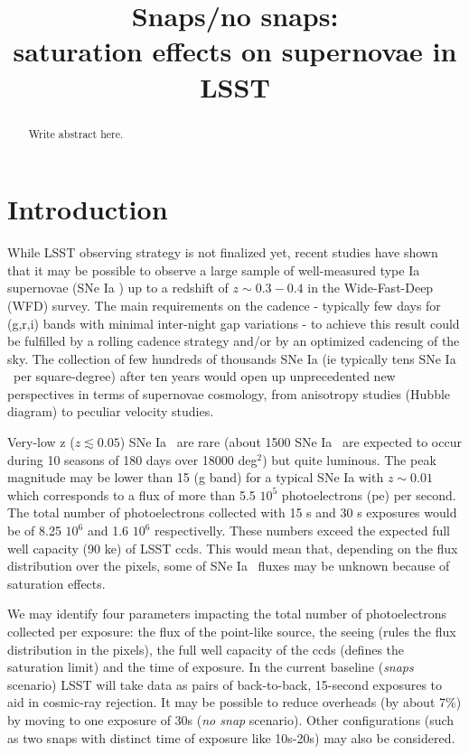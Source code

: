 \documentclass[\docopts]{\docclass}
\newcommand{\sne}{{SNe Ia }}
\newcommand{\pe}{{pe}}
\newcommand{\degsq}{deg$^2$}
\begin{document}
\title{Snaps/no snaps: \\ saturation effects on supernovae in LSST}

\maketitlepre

\begin{abstract}

  Write abstract here.

\end{abstract}

\dockeys{}

\maketitlepost


\section{Introduction}
\label{sec:intro}
While LSST observing strategy is not finalized yet, recent studies \cite{2018arXiv181200515L} have shown that it may be possible to observe a large sample of well-measured type Ia supernovae (\sne) up to a redshift of $z\sim 0.3-0.4$ in the Wide-Fast-Deep (WFD) survey. The main requirements on the cadence - typically few days for (g,r,i) bands with minimal inter-night gap variations - to achieve this result could be fulfilled by a rolling cadence strategy and/or by an optimized cadencing of the sky. The collection of few hundreds of thousands \sne (ie typically tens \sne~per square-degree) after ten years would open up unprecedented new perspectives in terms of supernovae cosmology, from anisotropy studies (Hubble diagram) to peculiar velocity studies.\par
Very-low z ($z \lesssim 0.05$) \sne~are rare (about 1500 \sne~are expected to occur during 10 seasons of 180 days over 18000 \degsq) but quite luminous. The peak magnitude may be lower than 15 (g band) for a typical \sne with $z\sim 0.01$ which corresponds to a flux of more than 5.5 $10^5$ photoelectrons (\pe) per second. The total number of photoelectrons collected with 15 s and 30 s exposures would be of 8.25 $ 10^{6}$ and 1.6 $ 10^{6}$ respectivelly.  These numbers exceed the expected full well capacity (90 ke) of LSST ccds. This would mean that, depending on the flux distribution over the pixels, some of \sne~fluxes may be unknown because of saturation effects. \par
We may identify four parameters impacting the total number of photoelectrons collected per exposure: the flux of the point-like source, the seeing (rules the flux distribution in the pixels), the full well capacity of the ccds (defines the saturation limit) and the time of exposure. In the current baseline ({\it snaps} scenario) LSST will take data as pairs of back-to-back, 15-second exposures to aid in cosmic-ray rejection. It may be possible to reduce overheads (by about 7\%) by moving to one exposure of 30s ({\it no snap} scenario). Other configurations (such as two snaps with distinct time of exposure like 10s-20s) may also be considered. \par
\end{document}
